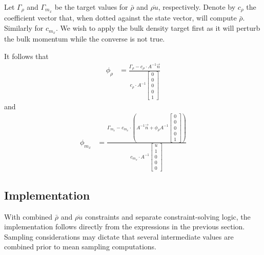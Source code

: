 \documentclass[letterpaper,11pt,nointlimits,reqno]{amsart}
\begin{document}
Let $\Gamma_\rho$ and $\Gamma_{m_x}$ be the target values for $\bar{\rho}$ and
$\overline{\rho{}u}$, respectively.  Denote by $c_\rho$ the coefficient vector
that, when dotted against the state vector, will compute $\bar{\rho}$.
Similarly for $c_{m_x}$.  We wish to apply the bulk density target first as it
will perturb the bulk momentum while the converse is not true.

It follows that
\begin{align}
  \phi_\rho &= \frac{
      \Gamma_\rho - c_\rho \cdot{} A^{-1} \vec{n}
  }{
      c_\rho \cdot{} A^{-1}
      \begin{bmatrix} 0 \\ 0 \\ 0 \\ 0 \\ 1 \end{bmatrix}
  }
\end{align}
and
\begin{align}
  \phi_{m_x} &= \frac{
      \Gamma_{m_x} - c_{m_x} \cdot{} \left(
          A^{-1} \vec{n}
        + \phi_\rho A^{-1}
          \begin{bmatrix} 0 \\ 0 \\ 0 \\ 0 \\ 1 \end{bmatrix}
      \right)
  }{
      c_{m_x} \cdot{} A^{-1}
      \begin{bmatrix} u \\ 1 \\ 0 \\ 0 \\ 0 \end{bmatrix}
  }
\end{align}

\subsection{Implementation}

With combined $\bar{\rho}$ and $\overline{\rho{}u}$ constraints and separate
constraint-solving logic, the implementation follows directly from the
expressions in the previous section.  Sampling considerations may dictate
that several intermediate values are combined prior to mean sampling
computations.


\newcommand*{\doi}[1]{\href{http://dx.doi.org/\detokenize{#1}}{doi: #1}}


\end{document}

